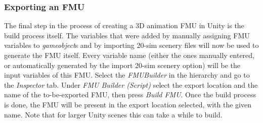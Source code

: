\subsubsection{Exporting an FMU} \label{sec:simulators:20sim:fmuexport}
The final step in the process of creating a 3D animation FMU in Unity is the build process itself. The variables that were added by manually assigning FMU variables to \textit{gameobject}s and by importing 20-sim scenery files will now be used to generate the FMU itself. Every variable name (either the ones manually entered, or automatically generated by the import 20-sim scenery option) will be the input variables of this FMU. Select the \textit{FMUBuilder} in the hierarchy and go to the \textit{Inspector} tab. Under \textit{FMU Builder (Script)} select the export location and the name of the to-be-exported FMU, then press \textit{Build FMU}. Once the build process is done, the FMU will be present in the export location selected, with the given name. Note that for larger Unity scenes this can take a while to build.

